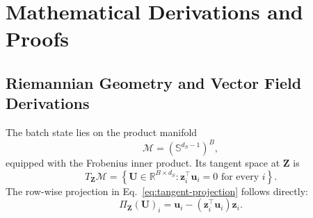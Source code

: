 \section{Mathematical Derivations and Proofs}
\label{app:derivations}

\subsection{Riemannian Geometry and Vector Field Derivations}
\label{app:riemannian-derivations}

The batch state lies on the product manifold
\begin{equation}
    \mathcal{M}
    =
    \left(\mathbb{S}^{d_S-1}\right)^B,
\end{equation}
equipped with the Frobenius inner product. Its tangent space at
$\mathbf{Z}$ is
\begin{equation}
    T_{\mathbf{Z}}\mathcal{M}
    =
    \left\{
        \mathbf{U}\in\mathbb{R}^{B\times d_S}
        :
        \mathbf{z}_i^\top\mathbf{u}_i=0
        \text{ for every }i
    \right\}.
    \label{eq:app-product-tangent}
\end{equation}
The row-wise projection in Eq.~\ref{eq:tangent-projection} follows directly:
\begin{equation}
    \Pi_{\mathbf{Z}}(\mathbf{U})_i
    =
    \mathbf{u}_i
    -
    (\mathbf{z}_i^\top\mathbf{u}_i)\mathbf{z}_i.
    \label{eq:app-batch-projection}
\end{equation}

